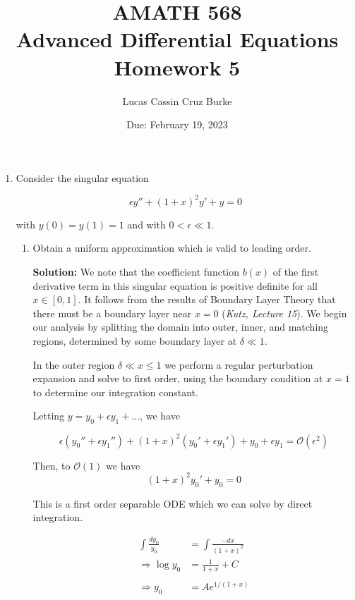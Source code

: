 \documentclass[12pt, a4paper]{article}
\begin{document}
\title{{AMATH 568\\
Advanced Differential Equations}\\
{\bf \Huge Homework 5}}

\author{Lucas Cassin Cruz Burke}

\date{Due: February 19, 2023}

\maketitle

\begin{enumerate}
    \item Consider the singular equation 

    $$\epsilon y'' + (1+x)^2 y' + y =0$$

    with $y(0)=y(1)=1$ and with $0 < \epsilon \ll 1$. 

    \begin{enumerate}
        \item Obtain a uniform approximation which is valid to leading order.

        \textbf{Solution:} We note that the coefficient function $b(x)$ of the first derivative term in this singular equation is positive definite for all $x \in [0,1]$. It follows from the results of Boundary Layer Theory that there must be a boundary layer near $x=0$ (\textit{Kutz, Lecture 15}). We begin our analysis by splitting the domain into outer, inner, and matching regions, determined by some boundary layer at $\delta \ll 1$.
        
        In the outer region $\delta \ll x \le 1$ we perform a regular perturbation expansion and solve to first order, using the boundary condition at $x=1$ to determine our integration constant.

        Letting $y=y_0 + \epsilon y_1 + \dots$, we have 

        $$\epsilon (y_0'' + \epsilon y_1'') + (1+x)^2(y_0' + \epsilon y_1') + y_0 + \epsilon y_1 = \mathcal{O}(\epsilon^2)$$

        Then, to $\mathcal{O}(1)$ we have
        $$(1+x)^2y_0' + y_0 = 0$$

        This is a first order separable ODE which we can solve by direct integration.

        \begin{align*}
            \int \frac{dy_0}{y_0} &= \int \frac{-dx}{(1+x)^2} \\
            \Rightarrow \log y_0 &= \frac{1}{1+x} + C \\\\
            \Rightarrow y_0 &= A e^{1/(1+x)}
        \end{align*}


\end{enumerate}
\end{enumerate}
\end{document}
